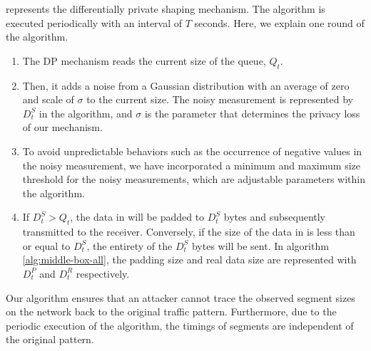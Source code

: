  

 represents the differentially private shaping
mechanism.  The algorithm is executed periodically with an interval of $T$
seconds.  Here, we explain one round of the algorithm.
\begin{enumerate}
  \item The DP mechanism reads the current size of the queue, $Q_t$.
  \item Then, it adds a noise from a Gaussian distribution with an average of
  zero and scale of ${\sigma}$ to the current size. The noisy measurement is
  represented by $D^S_t$ in the algorithm, and $\sigma$ is the parameter that
  determines the privacy loss of our mechanism.
  \item To avoid unpredictable behaviors such as the occurrence of negative
  values in the noisy measurement, we have incorporated a minimum and maximum
  size threshold for the noisy measurements, which are adjustable parameters
  within the algorithm.
  \item If $D^S_t > Q_t$, the data in {\unshapedQ} will be padded to $D^S_t$
  bytes and subsequently transmitted to the receiver.
  Conversely, if the size of the data in {\unshapedQ} is less than or equal to
  $D^S_t$, the entirety of the $D^S_t$ bytes will be sent.  In algorithm
  \ref{alg:middle-box-all}, the padding size and real data size are represented
  with $D^P_t$ and $D^R_t$ respectively.
\end{enumerate}
\fi

Our algorithm ensures that an attacker cannot trace the observed segment sizes
on the network back to the original traffic pattern.  Furthermore, due to the
periodic execution of the algorithm, the timings of segments are independent of the
original pattern.


